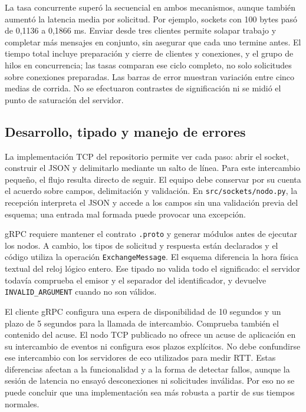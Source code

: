 La tasa concurrente superó la secuencial en ambos mecanismos, aunque
también aumentó la latencia media por solicitud. Por ejemplo, sockets
con 100 bytes pasó de 0,1136 a 0,1866 ms. Enviar desde tres clientes
permite solapar trabajo y completar más mensajes en conjunto, sin
asegurar que cada uno termine antes.
El tiempo total incluye preparación y cierre de clientes y conexiones,
y el grupo de hilos en concurrencia; las tasas comparan ese ciclo
completo, no solo solicitudes sobre conexiones preparadas.
Las barras de error muestran variación entre cinco medias de corrida.
No se efectuaron contrastes de significación ni se midió el punto de
saturación del servidor.

\subsection{Desarrollo, tipado y manejo de errores}
La implementación TCP del repositorio permite ver cada paso: abrir
el socket, construir el JSON y delimitarlo mediante un salto de línea.
Para este intercambio pequeño, el flujo resulta directo de seguir.
El equipo debe conservar por su cuenta el acuerdo sobre campos,
delimitación y validación. En \texttt{src/sockets/nodo.py}, la recepción
interpreta el JSON y accede a los campos sin una validación previa
del esquema; una entrada mal formada puede provocar una excepción.

gRPC requiere mantener el contrato \texttt{.proto} y generar módulos
antes de ejecutar los nodos. A cambio, los tipos de solicitud y respuesta
están declarados y el código utiliza la operación
\texttt{ExchangeMessage}. El esquema diferencia la hora física textual
del reloj lógico entero. Ese tipado no valida todo el significado:
el servidor todavía comprueba el emisor y el separador del identificador,
y devuelve \texttt{INVALID\_ARGUMENT} cuando no son válidos.

El cliente gRPC configura una espera de disponibilidad de 10 segundos
y un plazo de 5 segundos para la llamada de intercambio. Comprueba
también el contenido del acuse. El nodo TCP publicado no ofrece un
acuse de aplicación en su intercambio de eventos ni configura esos
plazos explícitos. No debe confundirse ese intercambio con los
servidores de eco utilizados para medir RTT. Estas diferencias afectan
a la funcionalidad y a la forma de detectar fallos, aunque la sesión
de latencia no ensayó desconexiones ni solicitudes inválidas.
Por eso no se puede concluir que una implementación sea más robusta
a partir de sus tiempos normales.

